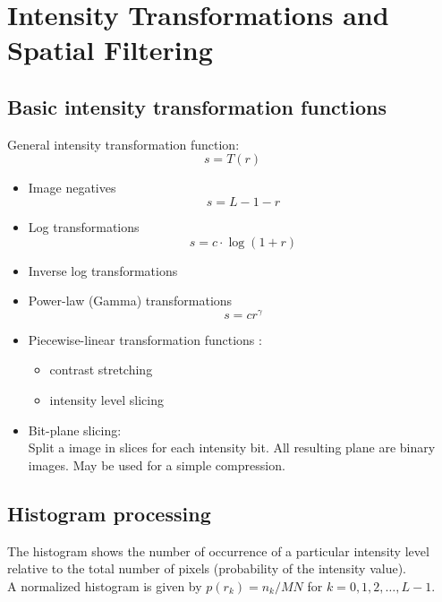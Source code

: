 \section{Intensity Transformations and Spatial Filtering  }

\subsection{Basic intensity transformation functions }
General intensity transformation function:
\begin{equation}
s = T(r)
\end{equation}

\begin{itemize}
	\item Image negatives
		\begin{equation}
			s = L-1-r
		\end{equation}
	\item Log transformations
		\begin{equation}
			s = c \cdot \log{(1 + r)}
		\end{equation}
	\item Inverse log transformations
	\item Power-law (Gamma) transformations
		\begin{equation}
			s = c r^\gamma
		\end{equation}
	\item Piecewise-linear transformation functions :
			\begin{itemize}
				\item contrast stretching
				\item intensity level slicing
			\end{itemize}
	\item Bit-plane slicing: \\ 
		Split a image in slices for each intensity bit.  All resulting plane are binary images.
		May be used for a simple compression.
	
\end{itemize}


\subsection{Histogram processing }
The histogram shows the number of occurrence of a particular intensity level relative to the total number of pixels (probability of the intensity value). \\
A normalized histogram is given by $p(r_k) = n_k / MN$ for $k=0,1,2,\dots,L-1$.

